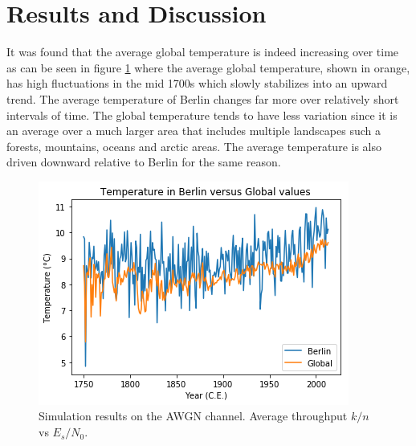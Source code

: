 \documentclass[journal, a4paper]{IEEEtran}
\begin{document}
\section{Results and Discussion}

	It was found that the average global temperature is indeed increasing over time as can be seen in figure \ref{fig1} where the average global temperature, shown in orange, has high fluctuations in the mid 1700s which slowly stabilizes into an upward trend. The average temperature of Berlin changes far more over relatively short intervals of time. The global temperature tends to have less variation since it is an average over a much larger area that includes multiple landscapes such a forests, mountains, oceans and arctic areas. The average temperature is also driven downward relative to Berlin for the same reason.\\

	\begin{figure}[!hbt]
		\begin{center}
		\includegraphics[width=\columnwidth]{AverageTemperaturePlot.png}
		\caption{Simulation results on the AWGN channel. Average throughput $k/n$ vs $E_s/N_0$.}
		\label{fig1}
		\end{center}
	\end{figure}
    
\end{document}
